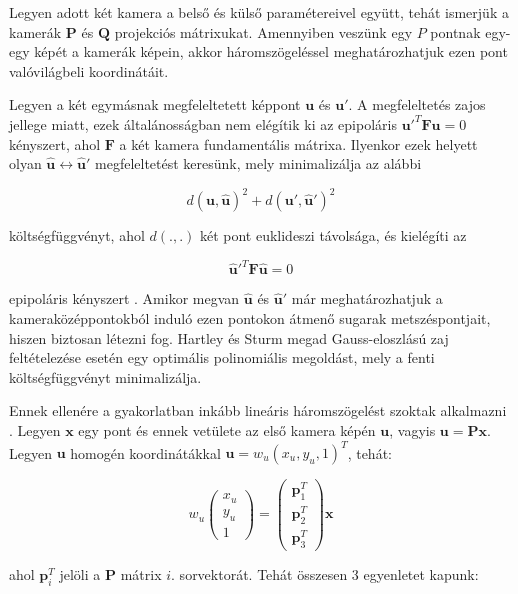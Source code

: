 Legyen adott két kamera a belső és külső paramétereivel együtt, tehát ismerjük a kamerák $\mathbf{P}$ és $\mathbf{Q}$ projekciós mátrixukat. Amennyiben veszünk egy $P$ pontnak egy-egy képét a kamerák képein, akkor háromszögeléssel meghatározhatjuk ezen pont valóvilágbeli koordinátáit.

Legyen a két egymásnak megfeleltetett képpont $\mathbf{u}$ és $\mathbf{u}'$. A megfeleltetés zajos jellege miatt, ezek általánosságban nem elégítik ki az epipoláris $\mathbf{u}'^T \mathbf{F} \mathbf{u} = 0$ kényszert, ahol $\mathbf{F}$ a két kamera fundamentális mátrixa. Ilyenkor ezek helyett olyan $\mathbf{\hat{u}} \leftrightarrow \mathbf{\hat{u}}'$ megfeleltetést keresünk, mely minimalizálja az alábbi

\[d(\mathbf{u}, \mathbf{\hat{u}})^2 + d(\mathbf{u}', \mathbf{\hat{u}}')^2\]

költségfüggvényt, ahol $d(., .)$ két pont euklideszi távolsága, és kielégíti az

\[\mathbf{\hat{u}}'^T \mathbf{F} \mathbf{\hat{u}} = 0\]

epipoláris kényszert \cite{hartley-triangulation}. Amikor megvan $\mathbf{\hat{u}}$ és $\mathbf{\hat{u}}'$ már meghatározhatjuk a kameraközéppontokból induló ezen pontokon átmenő sugarak metszéspontjait, hiszen biztosan létezni fog. Hartley és Sturm \cite{hartley-triangulation} megad Gauss-eloszlású zaj feltételezése esetén egy optimális polinomiális megoldást, mely a fenti költségfüggvényt minimalizálja.

Ennek ellenére a gyakorlatban inkább lineáris háromszögelést szoktak alkalmazni \cite[5.1 szekció]{hartley-triangulation}. Legyen $\mathbf{x}$ egy pont és ennek vetülete az első kamera képén $\mathbf{u}$, vagyis $\mathbf{u} = \mathbf{P}\mathbf{x}$. Legyen $\mathbf{u}$ homogén koordinátákkal $\mathbf{u} = w_u(x_u, y_u, 1)^T$, tehát:

\[w_u\left( \begin{array}{c} x_u \\ y_u \\ 1 \end{array} \right) = \left( \begin{array}{c} \mathbf{p}_1^T \\ \mathbf{p}_2^T \\ \mathbf{p}_3^T \end{array} \right) \mathbf{x}\]

ahol $\mathbf{p}_i^T$ jelöli a $\mathbf{P}$ mátrix $i$. sorvektorát. Tehát összesen 3 egyenletet kapunk:

